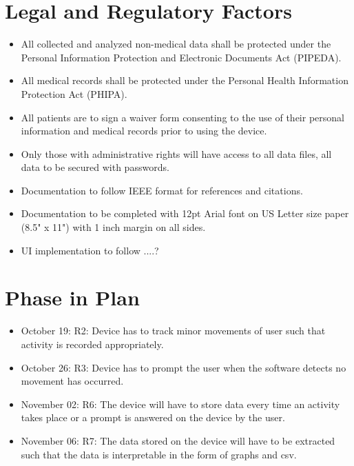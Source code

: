 \documentclass[12pt]{article}
\begin{document}
\section{Legal and Regulatory Factors}
\label{Legal}

\begin{itemize}
	\item All collected and analyzed non-medical data shall be protected under the Personal Information Protection and Electronic Documents Act (PIPEDA).
	\item All medical records shall be protected under the Personal Health Information Protection Act (PHIPA).
	\item All patients are to sign a waiver form consenting to the use of their personal information and medical records prior to using the device.
	\item Only those with administrative rights will have access to all data files, all data to be secured with passwords.
	\item Documentation to follow IEEE format for references and citations.
	\item Documentation to be completed with 12pt Arial font on US Letter size paper (8.5" x 11") with 1 inch margin on all sides.
	\item UI implementation to follow ....?
\end{itemize}

\section{Phase in Plan}
\label{Phase_In}

\begin{itemize}
\item October 19: R2: Device has to track minor movements of user such that activity is recorded appropriately.\\
\item October 26: R3: Device has to prompt the user when the software detects no movement has occurred.\\
\item November 02:  R6: The device will have to store data every time an activity takes place or a prompt is answered on the device by the user.\\
\item November 06:  R7: The data stored on the device will have to be extracted such that the data is interpretable in the form of graphs and csv.\\
\end{itemize}
\newpage
\end{document}
